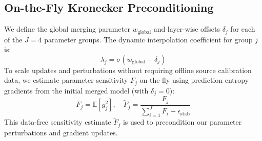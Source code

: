 \documentclass{article}
\theoremstyle{plain}
\theoremstyle{definition}
\theoremstyle{remark}
\begin{document}
\subsection{On-the-Fly Kronecker Preconditioning}
We define the global merging parameter $w_{\text{global}}$ and layer-wise offsets $\delta_j$ for each of the $J=4$ parameter groups. The dynamic interpolation coefficient for group $j$ is:
\begin{equation}
\lambda_j = \sigma(w_{\text{global}} + \delta_j)
\end{equation}
To scale updates and perturbations without requiring offline source calibration data, we estimate parameter sensitivity $F_j$ on-the-fly using prediction entropy gradients from the initial merged model (with $\delta_j = 0$):
\begin{equation}
F_j = \mathbb{E} \left[ g_j^2 \right], \quad \tilde{F}_j = \frac{F_j}{\sum_{i=1}^J F_i + \epsilon_{\text{stab}}}
\end{equation}
This data-free sensitivity estimate $\tilde{F}_j$ is used to precondition our parameter perturbations and gradient updates.
\end{document}
